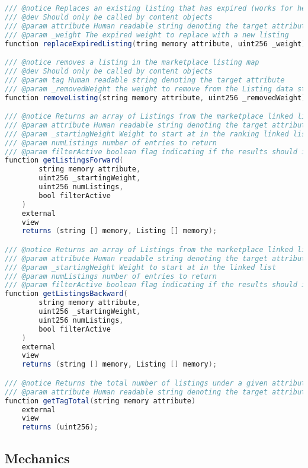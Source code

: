 \begin{lstlisting}[language=Java, caption=A minimal interface for reading and writing to the global ranking namespace.]
/// @notice Replaces an existing listing that has expired (works for head and tail listings)
/// @dev Should only be called by content objects
/// @param attribute Human readable string denoting the target attribute to stake
/// @param _weight The expired weight to replace with a new listing
function replaceExpiredListing(tring memory attribute, uint256 _weight) external;

/// @notice removes a listing in the marketplace listing map
/// @dev Should only be called by content objects
/// @param tag Human readable string denoting the target attribute
/// @param _removedWeight the weight to remove from the Listing data structure
function removeListing(string memory attribute, uint256 _removedWeight) external;

/// @notice Returns an array of Listings from the marketplace linked list from highest to lowest ranked
/// @param attribute Human readable string denoting the target attribute to stake
/// @param _startingWeight Weight to start at in the ranking linked list
/// @param numListings number of entries to return
/// @param filterActive boolean flag indicating if the results should include expired listings (false) or not (true)
function getListingsForward(
        string memory attribute, 
        uint256 _startingWeight, 
        uint256 numListings, 
        bool filterActive
    ) 
    external 
    view 
    returns (string [] memory, Listing [] memory);

/// @notice Returns an array of Listings from the marketplace linked list from lowest to highest ranked
/// @param attribute Human readable string denoting the target attribute to stake
/// @param _startingWeight Weight to start at in the linked list
/// @param numListings number of entries to return
/// @param filterActive boolean flag indicating if the results should include expired listings (false) or not (true)
function getListingsBackward(
        string memory attribute, 
        uint256 _startingWeight, 
        uint256 numListings, 
        bool filterActive
    )
    external 
    view 
    returns (string [] memory, Listing [] memory);

/// @notice Returns the total number of listings under a given attribute (including expired listings which have not been removed)
/// @param attribute Human readable string denoting the target attribute to stake
function getTagTotal(string memory attribute)
    external 
    view 
    returns (uint256);
\end{lstlisting}

\subsection{Mechanics}
\label{PrimitiveMechanics}

